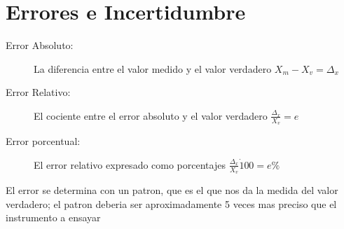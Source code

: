 \chapter{Errores e Incertidumbre}

\begin{description}
  \item[Error Absoluto:] La diferencia entre el valor medido y el valor verdadero
    $X_m - X_v = \Delta_x$
  \item[Error Relativo:] El cociente entre el error absoluto y el valor verdadero
    $\frac{\Delta_x}{X_v} = e$
  \item[Error porcentual:] El error relativo expresado como porcentajes
    $\frac{\Delta_x}{X_v} \dot 100 = e\%$
\end{description}

El error se determina con un patron, que es el que nos da la medida 
del valor verdadero; el patron deberia ser aproximadamente 5 veces
mas preciso que el instrumento a ensayar

\begin{description}
  \item 
\end{description}
